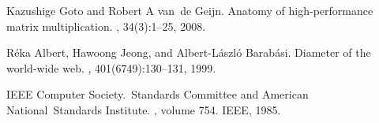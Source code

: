\documentclass[10pt,twocolumn,letterpaper]{article}
\begin{document}
{\begin{thebibliography}{10}
Kazushige Goto and Robert A van~de Geijn.
\newblock Anatomy of high-performance matrix multiplication.
, 34(3):1--25,
  2008.


R{\'e}ka Albert, Hawoong Jeong, and Albert-L{\'a}szl{\'o} Barab{\'a}si.
\newblock Diameter of the world-wide web.
, 401(6749):130--131, 1999.

IEEE Computer Society.~Standards Committee and American National~Standards
  Institute.
, volume 754.
\newblock IEEE, 1985.

\end{thebibliography}

}
\end{document}

